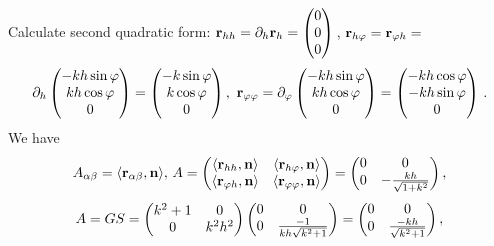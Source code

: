 \documentclass[12pt]{article}
\theoremstyle{theorem}
\numberwithin{equation}{section}
\begin{document}
Calculate   second quadratic form:  ${\bf r}_{hh}=\partial_h{\bf r}_h=
  \begin{pmatrix}
        0\\
        0\\
        0\\
   \end{pmatrix}\,$, ${\bf r}_{h\varphi}={\bf r}_{\varphi h}=$
             $$
             \partial_h
       \begin{pmatrix}
        -kh\sin\varphi\\
        kh\cos\varphi\\
          0\\
   \end{pmatrix}=\begin{pmatrix}
        -k\sin\varphi\\
        k\cos\varphi\\
          0\\
   \end{pmatrix},\,\,
   {\bf r}_{\varphi \varphi}=\partial_\varphi
       \begin{pmatrix}
        -kh\sin\varphi\\
        kh\cos\varphi\\
          0\\
   \end{pmatrix}=\begin{pmatrix}
        -kh\cos\varphi\\
        -kh\sin\varphi\\
          0\\
   \end{pmatrix}\,.
                      $$
We have
                    \begin{equation}\label{secquadrformforcylinder}
            A_{\alpha\beta}=\langle{\bf r}_{\alpha\beta},{\bf n}\rangle,\,
              A=\begin{pmatrix}\langle{\bf r}_{hh},{\bf n}\rangle&\langle{\bf r}_{h\varphi},{\bf n}\rangle\cr
                               \langle{\bf r}_{\varphi h},{\bf n}\rangle &\langle{\bf r}_{\varphi\varphi},{\bf n}\rangle\cr
                                   \end{pmatrix}=
                                   \begin{pmatrix}0&0\cr
                                0&-{kh\over {\sqrt {1+k^2}}}\cr
                                   \end{pmatrix},
                    \end{equation}
                    $$
       A=GS=\begin{pmatrix}k^2+1&0\cr
                                0&k^2h^2\cr
                                   \end{pmatrix}
                                   \begin{pmatrix}0&0\cr
                                0&{-1\over kh\sqrt {k^2+1}}\cr
                                   \end{pmatrix}=
                                   \begin{pmatrix}0&0\cr
                                0&{-kh\over \sqrt {k^2+1}}\cr
                                   \end{pmatrix},
                    $$
\end{document}
